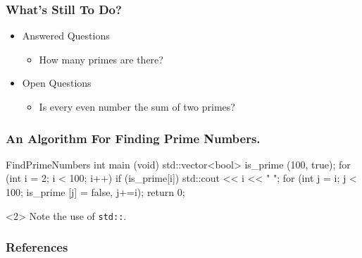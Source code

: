 \documentclass{beamer}
\begin{document}
  \begin{frame}[t]
    \frametitle{What's Still To Do?}
    \begin{itemize}
      \item Answered Questions
      \begin{itemize}
        \item How many primes are there?
      \end{itemize}
      \item Open Questions
      \begin{itemize}
        \item Is every even number the sum of two primes?
      \end{itemize}
    \end{itemize}
  \end{frame}
  
  \begin{frame}[fragile]
    \frametitle{An Algorithm For Finding Prime Numbers.}
    \begin{Code}[C++]{FindPrimeNumbers}
int main (void)
{
  std::vector<bool> is_prime (100, true);
  for (int i = 2; i < 100; i++)
  if (is_prime[i])
  {
    std::cout << i << " ";
    for (int j = i; j < 100; is_prime [j] = false, j+=i);
    }
    return 0;
}
    \end{Code}
    \begin{uncoverenv}<2>
      Note the use of \verb|std::|.
    \end{uncoverenv}
  \end{frame}
  
  \nocite{*}
  \begin{frame}[allowframebreaks]
    \frametitle{References}
    \printbibliography
  \end{frame}
  
\end{document}
